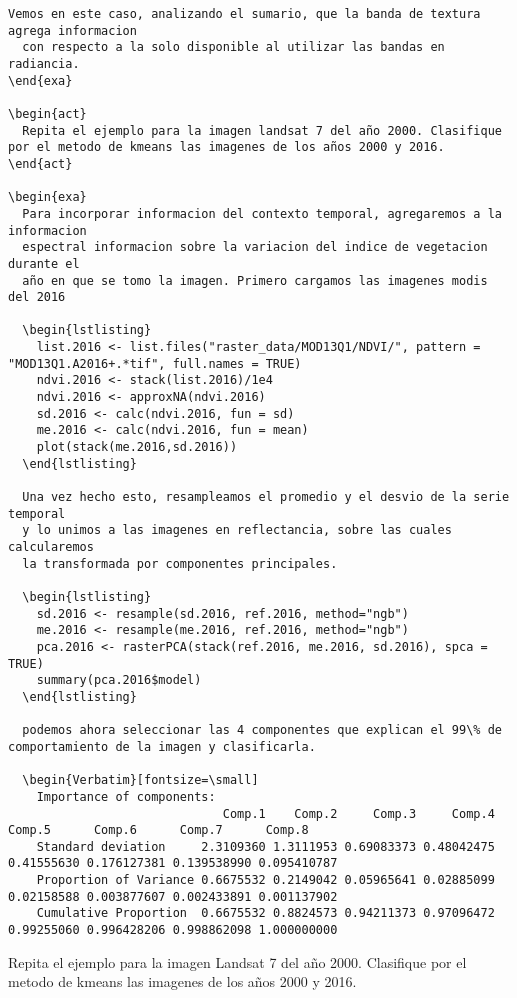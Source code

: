 \begin{exa}
\begin{Verbatim}[fontsize=\small]
  Vemos en este caso, analizando el sumario, que la banda de textura agrega informacion
  con respecto a la solo disponible al utilizar las bandas en radiancia.
\end{exa}

\begin{act}
  Repita el ejemplo para la imagen landsat 7 del año 2000. Clasifique por el metodo de kmeans las imagenes de los años 2000 y 2016.
\end{act}

\begin{exa}
  Para incorporar informacion del contexto temporal, agregaremos a la informacion
  espectral informacion sobre la variacion del indice de vegetacion durante el
  año en que se tomo la imagen. Primero cargamos las imagenes modis del 2016

  \begin{lstlisting}
    list.2016 <- list.files("raster_data/MOD13Q1/NDVI/", pattern = "MOD13Q1.A2016+.*tif", full.names = TRUE)
    ndvi.2016 <- stack(list.2016)/1e4
    ndvi.2016 <- approxNA(ndvi.2016)
    sd.2016 <- calc(ndvi.2016, fun = sd)
    me.2016 <- calc(ndvi.2016, fun = mean)
    plot(stack(me.2016,sd.2016))
  \end{lstlisting}

  Una vez hecho esto, resampleamos el promedio y el desvio de la serie temporal
  y lo unimos a las imagenes en reflectancia, sobre las cuales calcularemos
  la transformada por componentes principales.

  \begin{lstlisting}
    sd.2016 <- resample(sd.2016, ref.2016, method="ngb")
    me.2016 <- resample(me.2016, ref.2016, method="ngb")
    pca.2016 <- rasterPCA(stack(ref.2016, me.2016, sd.2016), spca = TRUE)
    summary(pca.2016$model)
  \end{lstlisting}

  podemos ahora seleccionar las 4 componentes que explican el 99\% de comportamiento de la imagen y clasificarla.

  \begin{Verbatim}[fontsize=\small]
    Importance of components:
                              Comp.1    Comp.2     Comp.3     Comp.4     Comp.5      Comp.6      Comp.7      Comp.8
    Standard deviation     2.3109360 1.3111953 0.69083373 0.48042475 0.41555630 0.176127381 0.139538990 0.095410787
    Proportion of Variance 0.6675532 0.2149042 0.05965641 0.02885099 0.02158588 0.003877607 0.002433891 0.001137902
    Cumulative Proportion  0.6675532 0.8824573 0.94211373 0.97096472 0.99255060 0.996428206 0.998862098 1.000000000
  \end{Verbatim}
\end{exa}

\begin{act}
  Repita el ejemplo para la imagen Landsat 7 del año 2000. Clasifique por el metodo de kmeans las imagenes de los años 2000 y 2016.
\end{act}
